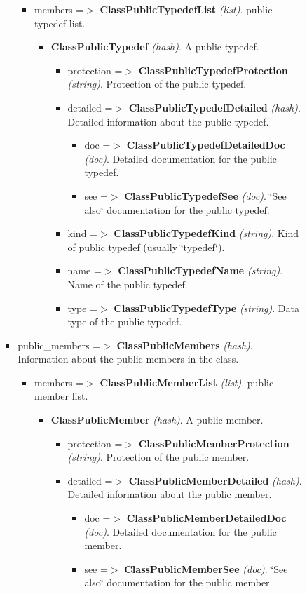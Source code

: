 \begin{itemize}
\begin{itemize}
\begin{itemize}
\begin{itemize}
\begin{itemize}
\item members =$>$ {\bf ClassPublicTypedefList} {\em (list)\/}. public typedef list. \begin{itemize}
\item {\bf ClassPublicTypedef} {\em (hash)\/}. A public typedef. \begin{itemize}
\item protection =$>$ {\bf ClassPublicTypedefProtection} {\em (string)\/}. Protection of the public typedef. \item detailed =$>$ {\bf ClassPublicTypedefDetailed} {\em (hash)\/}. Detailed information about the public typedef. \begin{itemize}
\item doc =$>$ {\bf ClassPublicTypedefDetailedDoc} {\em (doc)\/}. Detailed documentation for the public typedef. \item see =$>$ {\bf ClassPublicTypedefSee} {\em (doc)\/}. \char`\"{}See also\char`\"{} documentation for the public typedef. \end{itemize}
\item kind =$>$ {\bf ClassPublicTypedefKind} {\em (string)\/}. Kind of public typedef (usually \char`\"{}typedef\char`\"{}). \item name =$>$ {\bf ClassPublicTypedefName} {\em (string)\/}. Name of the public typedef. \item type =$>$ {\bf ClassPublicTypedefType} {\em (string)\/}. Data type of the public typedef. \end{itemize}
\end{itemize}
\end{itemize}
\item public\_\-members =$>$ {\bf ClassPublicMembers} {\em (hash)\/}. Information about the public members in the class. \begin{itemize}
\item members =$>$ {\bf ClassPublicMemberList} {\em (list)\/}. public member list. \begin{itemize}
\item {\bf ClassPublicMember} {\em (hash)\/}. A public member. \begin{itemize}
\item protection =$>$ {\bf ClassPublicMemberProtection} {\em (string)\/}. Protection of the public member. \item detailed =$>$ {\bf ClassPublicMemberDetailed} {\em (hash)\/}. Detailed information about the public member. \begin{itemize}
\item doc =$>$ {\bf ClassPublicMemberDetailedDoc} {\em (doc)\/}. Detailed documentation for the public member. \item see =$>$ {\bf ClassPublicMemberSee} {\em (doc)\/}. \char`\"{}See also\char`\"{} documentation for the public member. \end{itemize}

\end{itemize}
\end{itemize}
\end{itemize}
\end{itemize}
\end{itemize}
\end{itemize}
\end{itemize}
